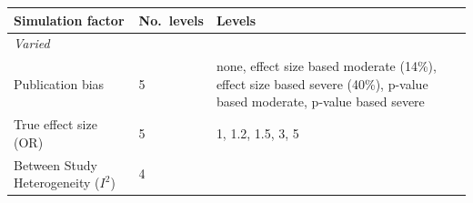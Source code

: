 \documentclass[
  english,
  doc,floatsintext,draftall]{apa6}
\begin{document}
\begin{longtable}[]{@{}lll@{}}
\toprule
\begin{minipage}[b]{0.37\columnwidth}\raggedright
Simulation factor\strut
\end{minipage} & \begin{minipage}[b]{0.12\columnwidth}\raggedright
No.~levels\strut
\end{minipage} & \begin{minipage}[b]{0.43\columnwidth}\raggedright
Levels\strut
\end{minipage}\tabularnewline
\midrule
\endhead
\begin{minipage}[t]{0.37\columnwidth}\raggedright
\emph{Varied}\strut
\end{minipage} & \begin{minipage}[t]{0.12\columnwidth}\raggedright
\strut
\end{minipage} & \begin{minipage}[t]{0.43\columnwidth}\raggedright
\strut
\end{minipage}\tabularnewline
\begin{minipage}[t]{0.37\columnwidth}\raggedright
Publication bias\strut
\end{minipage} & \begin{minipage}[t]{0.12\columnwidth}\raggedright
5\strut
\end{minipage} & \begin{minipage}[t]{0.43\columnwidth}\raggedright
none, effect size based moderate (14\%), effect size based severe (40\%), p-value based moderate, p-value based severe\strut
\end{minipage}\tabularnewline
\begin{minipage}[t]{0.37\columnwidth}\raggedright
True effect size (OR)\strut
\end{minipage} & \begin{minipage}[t]{0.12\columnwidth}\raggedright
5\strut
\end{minipage} & \begin{minipage}[t]{0.43\columnwidth}\raggedright
1, 1.2, 1.5, 3, 5\strut
\end{minipage}\tabularnewline
\begin{minipage}[t]{0.37\columnwidth}\raggedright
Between Study Heterogeneity (\(I^2\))\strut
\end{minipage} & \begin{minipage}[t]{0.12\columnwidth}\raggedright
4\strut
\end{minipage} & \begin{minipage}[t]{0.43\columnwidth}\raggedright

\end{minipage}
\end{longtable}
\end{document}
